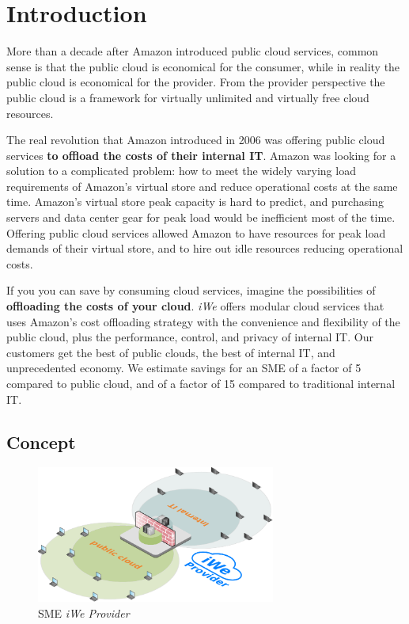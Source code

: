 \renewcommand{\thetable}{\thesection\alph{table}}

\chapter{Introduction}
\label{cha:introduction}

More than a decade after Amazon introduced public cloud services, common sense
is that the public cloud is economical for the consumer, while in reality the
public cloud is economical for the provider.  From the provider perspective the
public cloud is a framework for virtually unlimited and virtually free cloud
resources.

The real revolution that Amazon introduced in 2006 was offering public cloud
services \textbf{to offload the costs of their internal IT}. Amazon was looking
for a solution to a complicated problem: how to meet the widely varying load
requirements of Amazon's virtual store and reduce operational costs at the same
time. Amazon's virtual store peak capacity is hard to predict, and purchasing
servers and data center gear for peak load would be inefficient most of the
time. Offering public cloud services allowed Amazon to have resources for peak
load demands of their virtual store, and to hire out idle resources reducing
operational costs.

If you you can save by consuming cloud services, imagine the possibilities of
\textbf{offloading the costs of your cloud}.  \textit{iWe} offers modular cloud
services that uses Amazon's cost offloading strategy with the convenience and
flexibility of the public cloud, plus the performance, control, and privacy of
internal IT. Our customers get the best of public clouds, the best of internal
IT, and unprecedented economy. We estimate savings for an SME of a factor of 5
compared to public cloud, and of a factor of 15 compared to traditional internal
IT.

\section{Concept}
\label{sec:concept}

\begin{figure}
    \centering
    \includegraphics[width=0.7\textwidth]{images/iwe-providers-consumers-with-template2.pdf}
    \caption{SME \textit{iWe Provider}}
    \label{fig:the-clalld-pvt-pub}
\end{figure}

